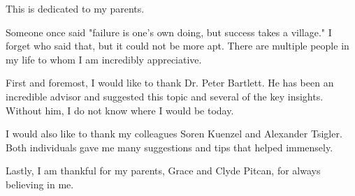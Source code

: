 \documentclass{ucbthesis}
\begin{document}
\begin{frontmatter}

\begin{dedication}
\null\vfil
\begin{center}
This is dedicated to my parents.
\end{center}
\vfil\null
\end{dedication}


\tableofcontents
\clearpage
\listoffigures
\clearpage
\listoftables

\begin{acknowledgements}
	
Someone once said "failure is one's own doing, but success takes a village." I forget who said that, but it could not be more apt. There are multiple people in my life to whom I am incredibly appreciative.

First and foremost, I would like to thank Dr. Peter Bartlett. He has been an incredible advisor and suggested this topic and several of the key insights. Without him, I do not know where I would be today.

I would also like to thank my colleagues Soren Kuenzel and Alexander Tsigler. Both individuals gave me many suggestions and tips that helped immensely.

Lastly, I am thankful for my parents, Grace and Clyde Pitcan, for always believing in me.

\end{acknowledgements}

\end{frontmatter}

\pagestyle{headings}









\printbibliography

\end{document}
